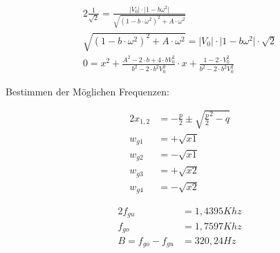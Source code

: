 \begin{alignat}{2}
\frac{1}{\sqrt{2}} = \frac{\lvert V_{0} \rvert \cdot \lvert 1- b \omega^2 \rvert}{\sqrt{(1- b \cdot \omega^2)^2 + A \cdot \omega^2}}\\
\sqrt{(1- b \cdot \omega^2)^2 + A \cdot \omega^2} = \lvert V_{0} \rvert \cdot \lvert 1- b \omega^2 \rvert \cdot \sqrt{2}\\
0 = x^2 + \frac{A^2 - 2 \cdot b + 4 \cdot b V_{0}^2}{b^2 - 2 \cdot b^2 V_{0}^2} \cdot x + \frac{1-2\cdot V_{0}^2}{b^2 - 2 \cdot b^2 V_{0}^2}
\end{alignat}

\noindent Bestimmen der Möglichen Frequenzen:

\begin{alignat}{2}
x_{1,2} &= -\frac{p}{2} \pm \sqrt{\frac{p}{2}^2 - q}\\
w_{g1} &= +\sqrt{x1}\\
w_{g2} &= -\sqrt{x1}\\
w_{g3} &= +\sqrt{x2}\\
w_{g4} &= -\sqrt{x2}
\end{alignat}

\begin{alignat}{2}
f_{gu} &= 1,4395 Khz\\
f_{go} &= 1,7597 Khz\\
B = f_{go} - f_{gu} &= 320,24 Hz
\end{alignat}

